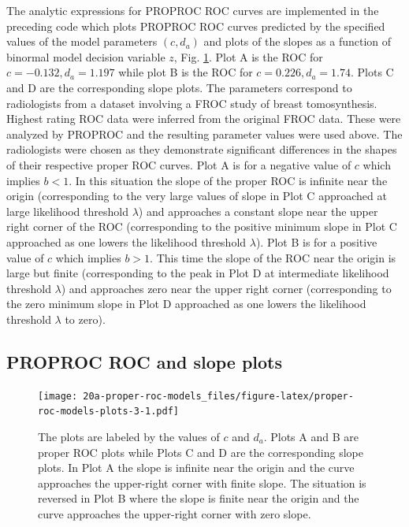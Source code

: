 \documentclass[
]{book}
\begin{document}
The analytic expressions for PROPROC ROC curves are implemented in the preceding code which plots PROPROC ROC curves predicted by the specified values of the model parameters \((c,d_a)\) and plots of the slopes as a function of binormal model decision variable \(z\), Fig. \ref{fig:proper-roc-models-plots-3}. Plot A is the ROC for \(c = -0.132, d_a = 1.197\) while plot B is the ROC for \(c = 0.226, d_a = 1.74\). Plots C and D are the corresponding slope plots. The parameters correspond to radiologists from a dataset \citep{andersson2008breast} involving a FROC study of breast tomosynthesis. Highest rating ROC data were inferred from the original FROC data. These were analyzed by PROPROC and the resulting parameter values were used above. The radiologists were chosen as they demonstrate significant differences in the shapes of their respective proper ROC curves. Plot A is for a negative value of \(c\) which implies \(b < 1\). In this situation the slope of the proper ROC is infinite near the origin (corresponding to the very large values of slope in Plot C approached at large likelihood threshold \(\lambda\)) and approaches a constant slope near the upper right corner of the ROC (corresponding to the positive minimum slope in Plot C approached as one lowers the likelihood threshold \(\lambda\)). Plot B is for a positive value of \(c\) which implies \(b > 1\). This time the slope of the ROC near the origin is large but finite (corresponding to the peak in Plot D at intermediate likelihood threshold \(\lambda\)) and approaches zero near the upper right corner (corresponding to the zero minimum slope in Plot D approached as one lowers the likelihood threshold \(\lambda\) to zero).

\hypertarget{proper-roc-models-proproc-rocs}{%
\subsection{PROPROC ROC and slope plots}\label{proper-roc-models-proproc-rocs}}

\begin{figure}
\centering
\texttt{[image: 20a-proper-roc-models\_files/figure-latex/proper-roc-models-plots-3-1.pdf]}
\caption{\label{fig:proper-roc-models-plots-3}The plots are labeled by the values of \(c\) and \(d_a\). Plots A and B are proper ROC plots while Plots C and D are the corresponding slope plots. In Plot A the slope is infinite near the origin and the curve approaches the upper-right corner with finite slope. The situation is reversed in Plot B where the slope is finite near the origin and the curve approaches the upper-right corner with zero slope.}
\end{figure}
\end{document}
